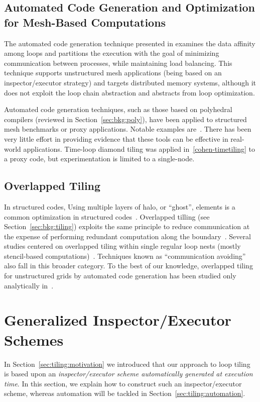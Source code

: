 \subsection*{Automated Code Generation and Optimization for Mesh-Based Computations}
The automated code generation technique presented in \cite{Ravishankar12} examines the data affinity among loops and partitions the execution with the goal of minimizing communication between processes, while maintaining load balancing. This technique supports unstructured mesh applications (being based on an inspector/executor strategy) and targets distributed memory systems, although it does not exploit the loop chain abstraction and abstracts from loop optimization.

Automated code generation techniques, such as those based on polyhedral compilers (reviewed in Section~\ref{sec:bkg:poly}), have been applied to structured mesh benchmarks or proxy applications. Notable examples are~\cite{pluto,polly,loopy}. There has been very little effort in providing evidence that these tools can be effective in real-world applications. Time-loop diamond tiling was applied in~\ref{cohen-timetiling} to a proxy code, but experimentation is limited to a single-node.

\subsection*{Overlapped Tiling}
In structured codes, Using multiple layers of halo, or ``ghost'', elements is a common optimization in structured codes~\cite{Bassetti98}. Overlapped tilling (see Section~\ref{sec:bkg:tiling}) exploits the same principle to reduce communication at the expense of performing redundant computation along the boundary~\cite{Zhou12}. Several studies centered on overlapped tiling within single regular loop nests (mostly stencil-based computations)~\cite{Meng09,Krishnamoorthy07,Chen02}. Techniques known as ``communication avoiding''~\cite{Demmel08,commAvoidingSparse2009} also fall in this broader category. To the best of our knowledge, overlapped tiling for unstructured grids by automated code generation has been studied only analytically in~\cite{gihan-overlapped}.



\section{Generalized Inspector/Executor Schemes}
\label{sec:tiling:lc}
In Section~\ref{sec:tiling:motivation} we introduced that our approach to loop tiling is based upon an \textit{inspector/executor scheme automatically generated at execution time}. In this section, we explain how to construct such an inspector/executor scheme, whereas automation will be tackled in Section~\ref{sec:tiling:automation}.


